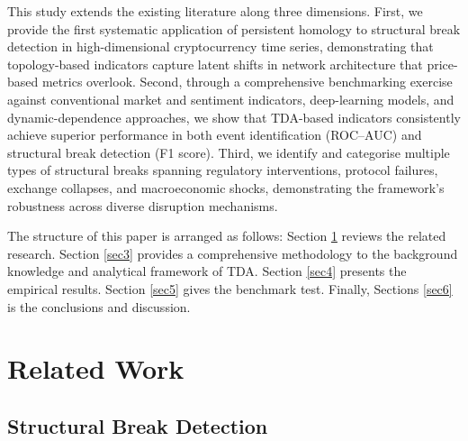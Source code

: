 \documentclass[11pt,reqno]{amsart}
\numberwithin{equation}{section} %
\begin{document}
This study extends the existing literature along three dimensions.
First, we provide the first systematic application of persistent homology to structural break detection in high-dimensional cryptocurrency time series, demonstrating that topology-based indicators capture latent shifts in network architecture that price-based metrics overlook. 
Second, through a comprehensive benchmarking exercise against conventional market and sentiment indicators, deep-learning models, and dynamic-dependence approaches, we show that TDA-based indicators consistently achieve superior performance in both event identification (ROC--AUC) and structural break detection (F1 score). 
Third, we identify and categorise multiple types of structural breaks spanning regulatory interventions, protocol failures, exchange collapses, and macroeconomic shocks, demonstrating the framework's robustness across diverse disruption mechanisms.

The structure of this paper is arranged as follows: Section \ref{sec2} reviews the related research. Section \ref{sec3} provides a comprehensive methodology to the background knowledge and analytical framework of TDA. Section \ref{sec4} presents the empirical results. Section \ref{sec5} gives the benchmark test. Finally, Sections \ref{sec6} is the conclusions and discussion.

\section{Related Work} \label{sec2}
\subsection{Structural Break Detection}
\end{document}
